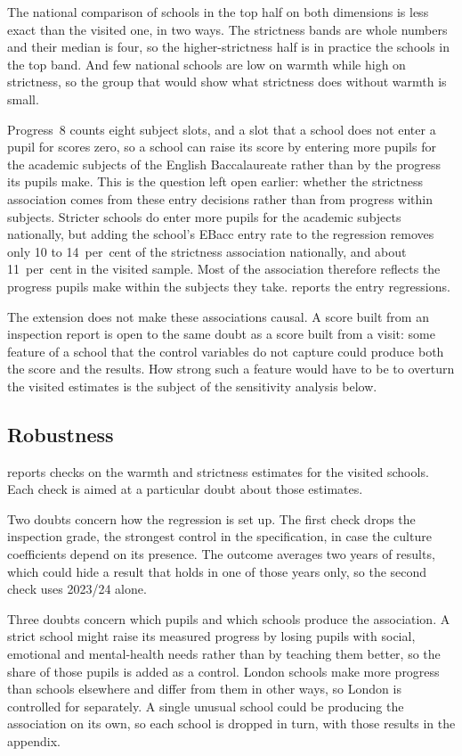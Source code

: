 The national comparison of schools in the top half on both dimensions is less exact than the visited one, in two ways. The strictness bands are whole numbers and their median is four, so the higher-strictness half is in practice the schools in the top band. And few national schools are low on warmth while high on strictness, so the group that would show what strictness does without warmth is small.

Progress~8 counts eight subject slots, and a slot that a school does not enter a pupil for scores zero, so a school can raise its score by entering more pupils for the academic subjects of the English Baccalaureate rather than by the progress its pupils make. This is the question left open earlier: whether the strictness association comes from these entry decisions rather than from progress within subjects. Stricter schools do enter more pupils for the academic subjects nationally, but adding the school's EBacc entry rate to the regression removes only 10 to 14~per~cent of the strictness association nationally, and about 11~per~cent in the visited sample. Most of the association therefore reflects the progress pupils make within the subjects they take.  reports the entry regressions.

The extension does not make these associations causal. A score built from an inspection report is open to the same doubt as a score built from a visit: some feature of a school that the control variables do not capture could produce both the score and the results. How strong such a feature would have to be to overturn the visited estimates is the subject of the sensitivity analysis below.

\subsection{Robustness}

 reports checks on the warmth and strictness estimates for the visited schools. Each check is aimed at a particular doubt about those estimates.

Two doubts concern how the regression is set up. The first check drops the inspection grade, the strongest control in the specification, in case the culture coefficients depend on its presence. The outcome averages two years of results, which could hide a result that holds in one of those years only, so the second check uses 2023/24 alone.

Three doubts concern which pupils and which schools produce the association. A strict school might raise its measured progress by losing pupils with social, emotional and mental-health needs rather than by teaching them better, so the share of those pupils is added as a control. London schools make more progress than schools elsewhere and differ from them in other ways, so London is controlled for separately. A single unusual school could be producing the association on its own, so each school is dropped in turn, with those results in the appendix.

